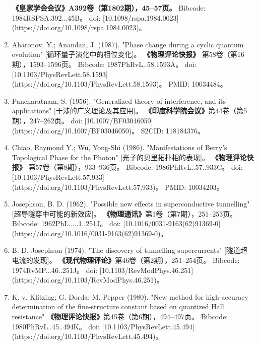\begin{enumerate}
  \textbf{《皇家学会会议》A392卷（第1802期），45–57页。}  
  Bibcode: 1984RSPSA.392...45B。  
  doi: [10.1098/rspa.1984.0023](https://doi.org/10.1098/rspa.1984.0023)。  
\item Aharonov, Y.; Anandan, J. (1987).  
  "Phase change during a cyclic quantum evolution" [循环量子演化中的相位变化]。  
  \textbf{《物理评论快报》} 第58卷（第16期），1593–1596页。  
  Bibcode: 1987PhRvL..58.1593A。  
  doi: [10.1103/PhysRevLett.58.1593](https://doi.org/10.1103/PhysRevLett.58.1593)。  
  PMID: 10034484。  
\item Pancharatnam, S. (1956).  
  "Generalized theory of interference, and its applications" [干涉的广义理论及其应用]。  
  \textbf{《印度科学院会议》}第44卷（第5期），247–262页。  
  doi: [10.1007/BF03046050](https://doi.org/10.1007/BF03046050)。  
  S2CID: 118184376。  
\item Chiao, Raymond Y.; Wu, Yong-Shi (1986).  
  "Manifestations of Berry's Topological Phase for the Photon" [光子的贝里拓扑相的表现]。  
  \textbf{《物理评论快报》} 第57卷（第8期），933–936页。  
  Bibcode: 1986PhRvL..57..933C。  
  doi: [10.1103/PhysRevLett.57.933](https://doi.org/10.1103/PhysRevLett.57.933)。  
  PMID: 10034203。  
\item Josephson, B. D. (1962).  
  "Possible new effects in superconductive tunnelling" [超导隧穿中可能的新效应]。  
  \textbf{《物理通讯》}第1卷（第7期），251–253页。  
  Bibcode: 1962PhL.....1..251J。  
  doi: [10.1016/0031-9163(62)91369-0](https://doi.org/10.1016/0031-9163(62)91369-0)。  
\item B. D. Josephson (1974).  
  "The discovery of tunnelling supercurrents" [隧道超电流的发现]。  
\textbf{《现代物理评论》}第46卷（第2期），251–254页。  
  Bibcode: 1974RvMP...46..251J。  
  doi: [10.1103/RevModPhys.46.251](https://doi.org/10.1103/RevModPhys.46.251)。    
\item K. v. Klitzing; G. Dorda; M. Pepper (1980).  
  "New method for high-accuracy determination of the fine-structure constant based on quantized Hall resistance"  
  \textbf{《物理评论快报》}第45卷（第6期），494–497页。  
  Bibcode: 1980PhRvL..45..494K。  
  doi: [10.1103/PhysRevLett.45.494](https://doi.org/10.1103/PhysRevLett.45.494)。  


\end{enumerate}
